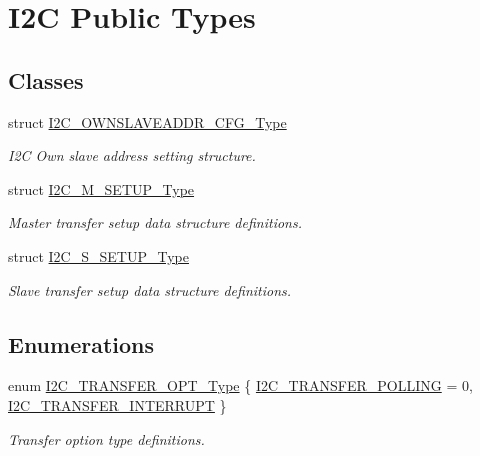 \hypertarget{group___i2_c___public___types}{\section{\-I2\-C \-Public \-Types}
\label{group___i2_c___public___types}
}
\subsection*{\-Classes}
\begin{DoxyCompactItemize}
\item 
struct \hyperlink{struct_i2_c___o_w_n_s_l_a_v_e_a_d_d_r___c_f_g___type}{\-I2\-C\-\_\-\-O\-W\-N\-S\-L\-A\-V\-E\-A\-D\-D\-R\-\_\-\-C\-F\-G\-\_\-\-Type}
\begin{DoxyCompactList}\small\item\em \-I2\-C \-Own slave address setting structure. \end{DoxyCompactList}\item 
struct \hyperlink{struct_i2_c___m___s_e_t_u_p___type}{\-I2\-C\-\_\-\-M\-\_\-\-S\-E\-T\-U\-P\-\_\-\-Type}
\begin{DoxyCompactList}\small\item\em \-Master transfer setup data structure definitions. \end{DoxyCompactList}\item 
struct \hyperlink{struct_i2_c___s___s_e_t_u_p___type}{\-I2\-C\-\_\-\-S\-\_\-\-S\-E\-T\-U\-P\-\_\-\-Type}
\begin{DoxyCompactList}\small\item\em \-Slave transfer setup data structure definitions. \end{DoxyCompactList}\end{DoxyCompactItemize}
\subsection*{\-Enumerations}
\begin{DoxyCompactItemize}
\item 
enum \hyperlink{group___i2_c___public___types_gacbdb9912dc18d79d425d9ac7e1333095}{\-I2\-C\-\_\-\-T\-R\-A\-N\-S\-F\-E\-R\-\_\-\-O\-P\-T\-\_\-\-Type} \{ \hyperlink{group___i2_c___public___types_ggacbdb9912dc18d79d425d9ac7e1333095a705c23545825458561fbfbf83393dc69}{\-I2\-C\-\_\-\-T\-R\-A\-N\-S\-F\-E\-R\-\_\-\-P\-O\-L\-L\-I\-N\-G} =  0, 
\hyperlink{group___i2_c___public___types_ggacbdb9912dc18d79d425d9ac7e1333095adcf6aee8de975dd710d711e590f3a753}{\-I2\-C\-\_\-\-T\-R\-A\-N\-S\-F\-E\-R\-\_\-\-I\-N\-T\-E\-R\-R\-U\-P\-T}
 \}
\begin{DoxyCompactList}\small\item\em \-Transfer option type definitions. \end{DoxyCompactList}\end{DoxyCompactItemize}


